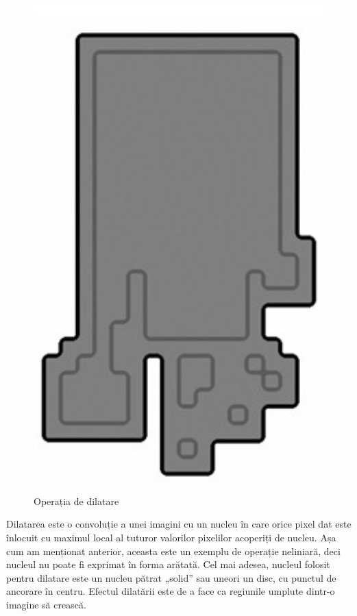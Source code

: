 \documentclass[a4paper,12pt]{report}
\begin{document}
\begin{figure}[h!]
\begin{minipage}{0.25\textwidth}
        \includegraphics[width=1\textwidth]{images/output_dilate.jpg}
        \caption{Operația de dilatare}
    \end{minipage}
\end{figure}
\FloatBarrier

Dilatarea este o convoluție a unei imagini cu un nucleu în care orice pixel dat este înlocuit cu maximul local al tuturor valorilor pixelilor acoperiți de nucleu. Așa cum am menționat anterior, aceasta este un exemplu de operație neliniară, deci nucleul nu poate fi exprimat în forma arătată. Cel mai adesea, nucleul folosit pentru dilatare este un nucleu pătrat „solid” sau uneori un disc, cu punctul de ancorare în centru. Efectul dilatării este de a face ca regiunile umplute dintr-o imagine să crească.
\end{document}
